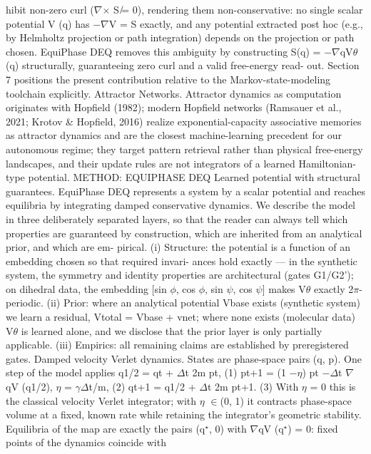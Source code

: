 \documentclass{article}
\begin{document}
hibit non-zero curl ($\nabla$$\times$ S ̸= 0), rendering them non-conservative: no single scalar potential V (q)
has $-$$\nabla$V = S exactly, and any potential extracted post hoc (e.g., by Helmholtz projection or path
integration) depends on the projection or path chosen. EquiPhase DEQ removes this ambiguity by
constructing S(q) = $-$$\nabla$qV$\theta$(q) structurally, guaranteeing zero curl and a valid free-energy read-
out. Section 7 positions the present contribution relative to the Markov-state-modeling toolchain
explicitly.
Attractor Networks.
Attractor dynamics as computation originates with Hopfield (1982); modern
Hopfield networks (Ramsauer et al., 2021; Krotov \& Hopfield, 2016) realize exponential-capacity
associative memories as attractor dynamics and are the closest machine-learning precedent for our
autonomous regime; they target pattern retrieval rather than physical free-energy landscapes, and
their update rules are not integrators of a learned Hamiltonian-type potential.
METHOD: EQUIPHASE DEQ
Learned potential with structural guarantees.
EquiPhase DEQ represents a system by a scalar
potential and reaches equilibria by integrating damped conservative dynamics. We describe the
model in three deliberately separated layers, so that the reader can always tell which properties
are guaranteed by construction, which are inherited from an analytical prior, and which are em-
pirical. (i) Structure: the potential is a function of an embedding chosen so that required invari-
ances hold exactly --- in the synthetic system, the symmetry and identity properties are architectural
(gates G1/G2'); on dihedral data, the embedding [sin $\phi$, cos $\phi$, sin $\psi$, cos $\psi$] makes V$\theta$ exactly 2$\pi$-
periodic. (ii) Prior: where an analytical potential Vbase exists (synthetic system) we learn a residual,
Vtotal = Vbase + vnet; where none exists (molecular data) V$\theta$ is learned alone, and we disclose that
the prior layer is only partially applicable. (iii) Empirics: all remaining claims are established by
preregistered gates.
Damped velocity Verlet dynamics.
States are phase-space pairs (q, p). One step of the model
applies
q1/2 = qt + $\Delta$t
2m pt,
(1)
pt+1 = (1 $-$$\eta$) pt $-$$\Delta$t $\nabla$qV (q1/2),
$\eta$ = $\gamma$$\Delta$t/m,
(2)
qt+1 = q1/2 + $\Delta$t
2m pt+1.
(3)
With $\eta$ = 0 this is the classical velocity Verlet integrator; with $\eta$ $\in$(0, 1) it contracts phase-space
volume at a fixed, known rate while retaining the integrator's geometric stability. Equilibria of the
map are exactly the pairs (q$^\star$, 0) with $\nabla$qV (q$^\star$) = 0: fixed points of the dynamics coincide with
\end{document}
